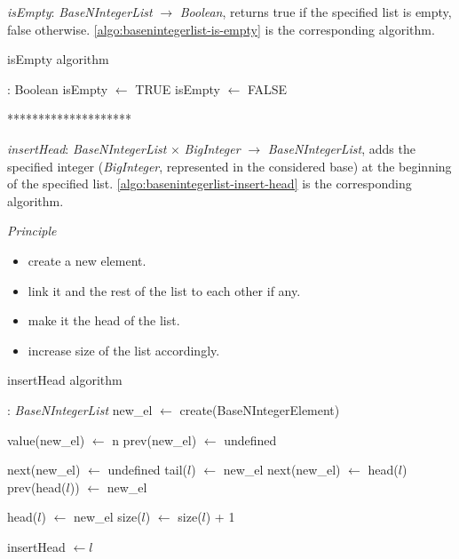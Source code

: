 \documentclass[book, nodocumentinfo]{upmethodology-document}
\newcommand{\separator}{\centerline{********************}}
\begin{document}
\emph{isEmpty}: \emph{BaseNIntegerList} \(\rightarrow\) \emph{Boolean},
returns true if the specified list is empty, false otherwise.
\ref{algo:basenintegerlist-is-empty} is the corresponding algorithm.

\begin{algorithm}[H]
    \caption{isEmpty algorithm}
    \label{algo:basenintegerlist-is-empty}

    \begin{algorithmic}
         : Boolean
                \State isEmpty \(\leftarrow\) TRUE
            \Else
                \State isEmpty \(\leftarrow\) FALSE
            \EndIf
        \EndFunction
    \end{algorithmic}
\end{algorithm}

\separator

\emph{insertHead}: \emph{BaseNIntegerList} \(×\) \emph{BigInteger} \(\rightarrow\) \emph{BaseNIntegerList},
adds the specified integer (\emph{BigInteger}, represented in the considered base) at the beginning
of the specified list.
\ref{algo:basenintegerlist-insert-head} is the corresponding algorithm.

\emph{Principle}
\begin{itemize}
    \item create a new element.
    \item link it and the rest of the list to each other if any.
    \item make it the head of the list.
    \item increase size of the list accordingly.
\end{itemize}

\begin{algorithm}[H]
    \caption{insertHead algorithm}
    \label{algo:basenintegerlist-insert-head}

    \begin{algorithmic}
         : \emph{BaseNIntegerList}
            \State new\_el \(\leftarrow\) create(BaseNIntegerElement)

            \State value(new\_el) \(\leftarrow\) n
            \State prev(new\_el) \(\leftarrow\) undefined

                \State next(new\_el) \(\leftarrow\) undefined
                \State tail(\(l\)) \(\leftarrow\) new\_el
            \Else
                \State next(new\_el) \(\leftarrow\) head(\(l\))
                \State prev(head(\(l\))) \(\leftarrow\) new\_el
            \EndIf

            \State head(\(l\)) \(\leftarrow\) new\_el
            \State size(\(l\)) \(\leftarrow\) size(\(l\)) + 1

            \State insertHead \(\leftarrow l\)
        \EndFunction
    \end{algorithmic}
\end{algorithm}
\end{document}
